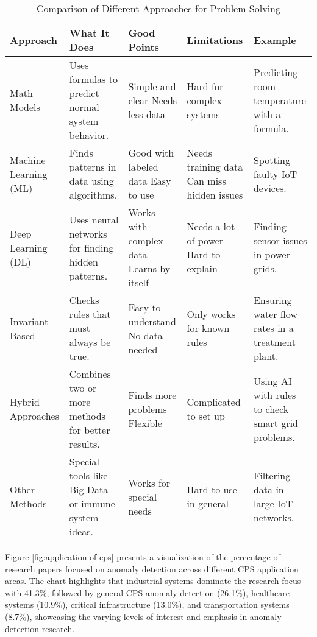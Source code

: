 \begin{table*}[h!]
\centering
\caption{Comparison of Different Approaches for Problem-Solving}
\label{tab:anomaly_comparison}
\renewcommand{\arraystretch}{1.5}
    \begin{tabular}{>{\raggedright\arraybackslash}m{2.5cm}>{\raggedright\arraybackslash}m{3.4cm}>{\raggedright\arraybackslash}m{3.3cm}>{\raggedright\arraybackslash}m{3.4cm}>{\raggedright\arraybackslash}m{3.4cm}}
        \hline
        \textbf{Approach} & \textbf{What It Does} & \textbf{Good Points} & \textbf{Limitations} & \textbf{Example} \\ \hline

        Math Models & Uses formulas to predict normal system behavior. & Simple and clear \newline Needs less data & Hard for complex systems & Predicting room temperature with a formula. \\ 
        \rowcolor[HTML]{EFEFEF}
        Machine Learning (ML) & Finds patterns in data using algorithms. & Good with labeled data \newline Easy to use & Needs training data \newline Can miss hidden issues & Spotting faulty IoT devices. \\ 
        Deep Learning (DL) & Uses neural networks for finding hidden patterns. & Works with complex data \newline Learns by itself & Needs a lot of power \newline Hard to explain & Finding sensor issues in power grids. \\ 
        \rowcolor[HTML]{EFEFEF}
        Invariant-Based & Checks rules that must always be true. & Easy to understand \newline No data needed & Only works for known rules & Ensuring water flow rates in a treatment plant. \\
        Hybrid Approaches & Combines two or more methods for better results. & Finds more problems \newline Flexible & Complicated to set up & Using AI with rules to check smart grid problems. \\ 
        \rowcolor[HTML]{EFEFEF}
        Other Methods & Special tools like Big Data or immune system ideas. & Works for special needs & Hard to use in general & Filtering data in large IoT networks. \\ \hline
    \end{tabular}

\end{table*}
Figure \ref{fig:application-of-cps} presents a visualization of the percentage of research papers focused on anomaly detection across different CPS application areas. The chart highlights that industrial systems dominate the research focus with 41.3\%, followed by general CPS anomaly detection (26.1\%), healthcare systems (10.9\%), critical infrastructure (13.0\%), and transportation systems (8.7\%), showcasing the varying levels of interest and emphasis in anomaly detection research.